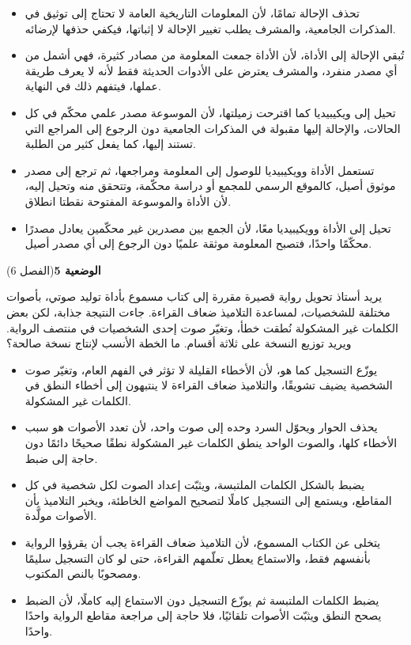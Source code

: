 \documentclass[11pt,a4paper]{article}
\begin{document}
\begin{itemize}[leftmargin=1.0cm, labelsep=6pt, itemsep=3pt, topsep=4pt, parsep=0pt]
  \item[\textbf{أ)}] تحذف الإحالة تمامًا، لأن المعلومات التاريخية العامة لا تحتاج إلى توثيق في المذكرات الجامعية، والمشرف يطلب تغيير الإحالة لا إثباتها، فيكفي حذفها لإرضائه.
  \item[\textbf{ب)}] تُبقي الإحالة إلى الأداة، لأن الأداة جمعت المعلومة من مصادر كثيرة، فهي أشمل من أي مصدر منفرد، والمشرف يعترض على الأدوات الحديثة فقط لأنه لا يعرف طريقة عملها، فيتفهم ذلك في النهاية.
  \item[\textbf{ج)}] تحيل إلى ويكيبيديا كما اقترحت زميلتها، لأن الموسوعة مصدر علمي محكّم في كل الحالات، والإحالة إليها مقبولة في المذكرات الجامعية دون الرجوع إلى المراجع التي تستند إليها، كما يفعل كثير من الطلبة.
  \item[\textbf{د)}] تستعمل الأداة وويكيبيديا للوصول إلى المعلومة ومراجعها، ثم ترجع إلى مصدر موثوق أصيل، كالموقع الرسمي للمجمع أو دراسة محكّمة، وتتحقق منه وتحيل إليه، لأن الأداة والموسوعة المفتوحة نقطتا انطلاق.
  \item[\textbf{هـ)}] تحيل إلى الأداة وويكيبيديا معًا، لأن الجمع بين مصدرين غير محكّمين يعادل مصدرًا محكّمًا واحدًا، فتصبح المعلومة موثقة علميًا دون الرجوع إلى أي مصدر أصيل.
\end{itemize}
\par\vspace{6pt}
\noindent
{\large\khatt\textbf{الوضعية 5}}\hfill{\small(الفصل 6)}\par\nopagebreak\vspace{3pt}
\setlength{\fboxsep}{7pt}\colorbox{gray!10}{\parbox{\dimexpr\linewidth-14pt}{يريد أستاذ تحويل رواية قصيرة مقررة إلى كتاب مسموع بأداة توليد صوتي، بأصوات مختلفة للشخصيات، لمساعدة التلاميذ ضعاف القراءة. جاءت النتيجة جذابة، لكن بعض الكلمات غير المشكولة نُطقت خطأ، وتغيّر صوت إحدى الشخصيات في منتصف الرواية. ويريد توزيع النسخة على ثلاثة أقسام. ما الخطة الأنسب لإنتاج نسخة صالحة؟}}\par\nopagebreak
\begin{itemize}[leftmargin=1.0cm, labelsep=6pt, itemsep=3pt, topsep=4pt, parsep=0pt]
  \item[\textbf{أ)}] يوزّع التسجيل كما هو، لأن الأخطاء القليلة لا تؤثر في الفهم العام، وتغيّر صوت الشخصية يضيف تشويقًا، والتلاميذ ضعاف القراءة لا ينتبهون إلى أخطاء النطق في الكلمات غير المشكولة.
  \item[\textbf{ب)}] يحذف الحوار ويحوّل السرد وحده إلى صوت واحد، لأن تعدد الأصوات هو سبب الأخطاء كلها، والصوت الواحد ينطق الكلمات غير المشكولة نطقًا صحيحًا دائمًا دون حاجة إلى ضبط.
  \item[\textbf{ج)}] يضبط بالشكل الكلمات الملتبسة، ويثبّت إعداد الصوت لكل شخصية في كل المقاطع، ويستمع إلى التسجيل كاملًا لتصحيح المواضع الخاطئة، ويخبر التلاميذ بأن الأصوات مولَّدة.
  \item[\textbf{د)}] يتخلى عن الكتاب المسموع، لأن التلاميذ ضعاف القراءة يجب أن يقرؤوا الرواية بأنفسهم فقط، والاستماع يعطل تعلّمهم القراءة، حتى لو كان التسجيل سليمًا ومصحوبًا بالنص المكتوب.
  \item[\textbf{هـ)}] يضبط الكلمات الملتبسة ثم يوزّع التسجيل دون الاستماع إليه كاملًا، لأن الضبط يصحح النطق ويثبّت الأصوات تلقائيًا، فلا حاجة إلى مراجعة مقاطع الرواية واحدًا واحدًا.
\end{itemize}
\end{document}
